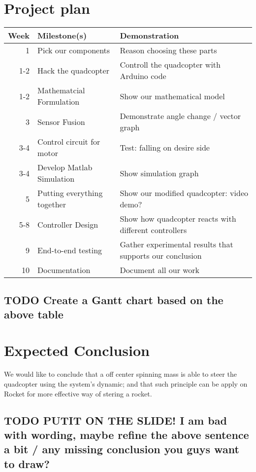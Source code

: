 \documentclass[11pt]{article}
\begin{document}
\section{Project plan}
\label{sec:orgfacdad9}
\begin{center}
\begin{tabular}{rll}
Week & Milestone(s) & Demonstration\\
\hline
1 & Pick our components & Reason choosing these parts\\
1-2 & Hack the quadcopter & Controll the quadcopter with Arduino code\\
1-2 & Mathematcial Formulation & Show our mathematical model\\
3 & Sensor Fusion & Demonstrate angle change / vector graph\\
3-4 & Control circuit for motor & Test: falling on desire side\\
3-4 & Develop Matlab Simulation & Show simulation graph\\
5 & Putting everything together & Show our modified quadcopter: video demo?\\
5-8 & Controller Design & Show how quadcopter reacts with different controllers\\
9 & End-to-end testing & Gather experimental results that supports our conclusion\\
10 & Documentation & Document all our work\\
\end{tabular}
\end{center}
\subsection{{\bfseries\sffamily TODO} Create a Gantt chart based on the above table}
\label{sec:orgee88eca}
\section{Expected Conclusion}
\label{sec:orgc592c37}
We would like to conclude that a off center spinning mass is able to steer the quadcopter using the system's dynamic; and that such principle can be apply on Rocket for more effective way of stering a rocket.
\subsection{{\bfseries\sffamily TODO} PUTIT ON THE SLIDE! I am bad with wording, maybe refine the above sentence a bit / any missing conclusion you guys want to draw?}
\label{sec:org7643dd6}
\end{document}
